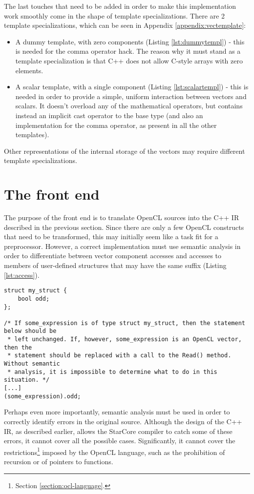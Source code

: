 The last touches that need to be added in order to make this implementation work smoothly come in the shape of template specializations. There are 2 template specializations, which can be seen in Appendix \ref{appendix:vectemplate}:
\begin{itemize}
\item A dummy template, with zero components (Listing \ref{lst:dummytempl}) - this is needed for the comma operator hack. The reason why it must stand as a template specialization is that C++ does not allow C-style arrays with zero elements.
\item A scalar template, with a single component (Listing \ref{lst:scalartempl}) - this is needed in order to provide a simple, uniform interaction between vectors and scalars. It doesn't overload any of the mathematical operators, but contains instead an implicit cast operator to the base type (and also an implementation for the comma operator, as present in all the other templates). 
\end{itemize}

Other representations of the internal storage of the vectors may require different template specializations.

\section{The front end}
The purpose of the front end is to translate OpenCL sources into the C++ IR described in the previous section. Since there are only a few OpenCL constructs that need to be transformed, this may initially seem like a task fit for a preprocessor. However, a correct implementation must use semantic analysis in order to differentiate between vector component accesses and accesses to members of user-defined structures that may have the same suffix (Listing \ref{lst:access}).

\begin{lstlisting}[label=lst:access, caption=Semantic analysis is a must]
struct my_struct {
	bool odd; 
};

/* If some_expression is of type struct my_struct, then the statement below should be 
 * left unchanged. If, however, some_expression is an OpenCL vector, then the 
 * statement should be replaced with a call to the Read() method. Without semantic 
 * analysis, it is impossible to determine what to do in this situation. */
[...]
(some_expression).odd;
\end{lstlisting}

Perhaps even more importantly, semantic analysis must be used in order to correctly identify errors in the original source. Although the design of the C++ IR, as described earlier, allows the StarCore compiler to catch some of these errors, it cannot cover all the possible cases. Significantly, it cannot cover the restrictions\footnote{Section \ref{section:ocl-language}.} imposed by the OpenCL language, such as the prohibition of recursion or of pointers to functions.

